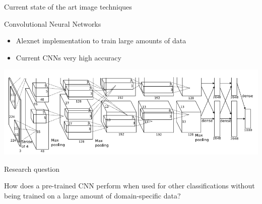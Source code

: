 \documentclass{beamer}
\begin{document}
    \begin{frame}{Current state of the art image techniques}
        \begin{block}{Convolutional Neural Networks}
            \begin{itemize}
            \item Alexnet implementation to train large amounts of data \cite{alexnet}
            \item Current CNNs very high accuracy \cite{cnn}
            \end{itemize}
        \end{block}
        \includegraphics[width=\textwidth]{images/alexnet2012.png}
    \end{frame}
    \begin{frame}{Research question}
        \begin{block}{How does a pre-trained CNN perform when used for other classifications without being trained on a large amount of domain-specific data?}
        \end{block}
    \end{frame}
\end{document}
